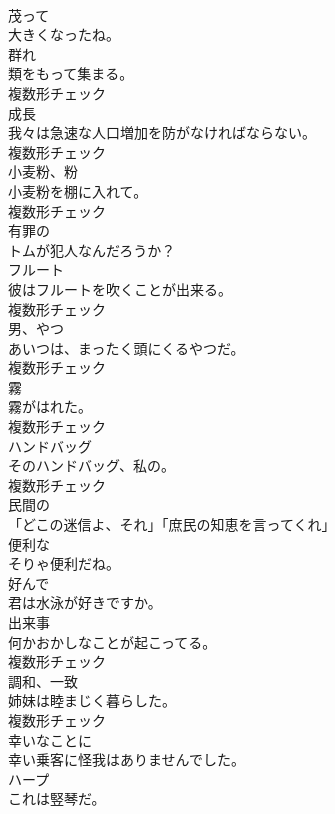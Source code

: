 \documentclass[8pt]{extreport}
\begin{document}
\begin{CJK}{UTF8}{min}
\\	[形容詞]	茂って	
\\	大きくなったね。	
\\	[名詞]	群れ	
\\	類をもって集まる。	
\\	複数形チェック
\\	[名詞]	成⻑	
\\	我々は急速な人口増加を防がなければならない。	
\\	複数形チェック
\\	[名詞]	小⻨粉、粉	
\\	小麦粉を棚に入れて。	
\\	複数形チェック
\\	[形容詞]	有罪の	
\\	トムが犯人なんだろうか？	
\\	[名詞]	フルート	
\\	彼はフルートを吹くことが出来る。	
\\	複数形チェック
\\	[名詞]	男、やつ	
\\	あいつは、まったく頭にくるやつだ。	
\\	複数形チェック
\\	[名詞]	霧	
\\	霧がはれた。	
\\	複数形チェック
\\	[名詞]	ハンドバッグ	
\\	そのハンドバッグ、私の。	
\\	複数形チェック
\\	[形容詞]	⺠間の	
\\	「どこの迷信よ、それ」「庶民の知恵を言ってくれ」	
\\	[形容詞]	便利な	
\\	そりゃ便利だね。	
\\	[形容詞]	好んで	
\\	君は水泳が好きですか。	
\\	[名詞]	出来事	
\\	何かおかしなことが起こってる。	
\\	複数形チェック
\\	[名詞]	調和、一致	
\\	姉妹は睦まじく暮らした。	
\\	複数形チェック
\\	[副詞]	幸いなことに	
\\	幸い乗客に怪我はありませんでした。	
\\	[名詞]	ハープ	
\\	これは竪琴だ。	

\end{CJK}
\end{document}
